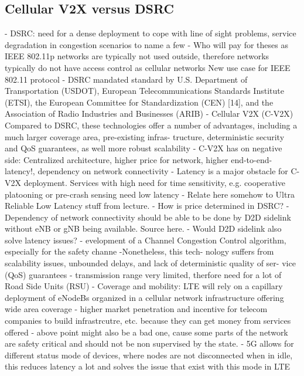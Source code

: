 \documentclass[conference,12pt,onecolumn]{IEEEtran}
\begin{document}
\subsection{Cellular V2X versus DSRC}
- DSRC: need for a dense deployment to cope with line of sight problems, service degradation in congestion scenarios to name a few \cite{machardy2018}
- Who will pay for theses as IEEE 802.11p networks are typically not used outside, therefore networks typically do not have access control as cellular networks \cite{machardy2018} New use case for IEEE 802.11 protocol
- DSRC mandated standard by U.S. Department of Transportation (USDOT), European Telecommunications Standards Institute (ETSI), the European Committee for Standardization (CEN) [14], and the Association of Radio Industries and Businesses (ARIB) \cite{machardy2018}
- Cellular V2X (C-V2X) Compared to DSRC, these technologies offer a number of advantages, including a much larger coverage area, pre-existing infras- tructure, deterministic security and QoS guarantees, as well more robust scalability \cite{machardy2018}
- C-V2X has on negative side: Centralized architecture, higher price for network, higher end-to-end-latency!, dependency on network connectivity \cite{machardy2018}
- Latency is a major obstacle for C-V2X deployment. Services with high need for time sensitivity, e.g. cooperative platooning or pre-crash sensing need low latency \cite{machardy2018}
- Relate here somehow to Ultra Reliable Low Latency stuff from lecture.
- How is price determined in DSRC?
- Dependency of network connectivity should be able to be done by D2D sidelink without eNB or gNB being available. Source here.
- Would D2D sidelink also solve latency issues?
- evelopment of a Channel Congestion Control
algorithm, especially for the safety channe \cite{kenney2011}
-Nonetheless, this tech- nology suffers from scalability issues, unbounded delays, and lack of deterministic quality of ser- vice (QoS) guarantees \cite{araniti2013}
- transmission range very limited, therfore need for a lot of Road Side Units (RSU) \cite{araniti2013}
- Coverage and mobility: LTE will rely on a capillary deployment of eNodeBs organized in a cellular network infrastructure offering wide area coverage \cite{araniti2013}
- higher market penetration and incentive for telecom companies to build infrastrcutre, etc. because they can get money from services offered \cite{lee2016}
- above point might also be a bad one, cause some parts of the network are safety critical and should not be non supervised by the state.
- 5G allows for different status mode of devices, where nodes are not disconnected when in idle, this reduces latency a lot and solves the issue that exist with this mode in LTE \cite{araniti2013}
\end{document}
